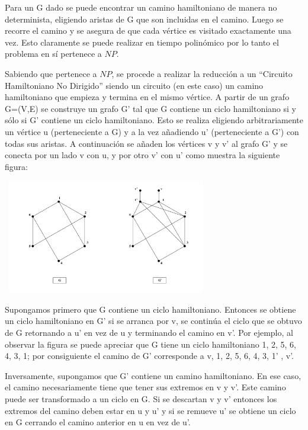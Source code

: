 \documentclass{article}
\newcommand\tab[1][0.5cm]{\hspace*{#1}}
\begin{document}
\begin{enumerate}
             \tab Para un G dado se puede encontrar un camino hamiltoniano de manera no determinista, eligiendo aristas de G que son
             incluidas en el camino. Luego se recorre el camino y se asegura de que cada vértice es visitado exactamente una vez.
             Esto claramente se puede realizar en tiempo polinómico por lo tanto el problema en sí pertenece a $NP$.

             \tab Sabiendo que pertenece a $NP$, se procede a realizar la reducción a un “Circuito Hamiltoniano No Dirigido” siendo un
             circuito (en este caso) un camino hamiltoniano que empieza y termina en el mismo vértice. A partir de un grafo
             G=(V,E) se construye un grafo G’ tal que G contiene un ciclo hamiltoniano si y sólo si  G’ contiene un ciclo hamiltoniano.
             Esto se realiza eligiendo arbitrariamente un vértice u (perteneciente a G) y a la vez añadiendo u’ (perteneciente a G’)
             con todas sus aristas. A continuación se añaden los vértices v y v’ al grafo G’ y se conecta por un lado v con u, y por otro v’
             con u’ como muestra la siguiente figura:

             \begin{center}
                 \includegraphics[width=9cm, height=5cm]{images/p3}
             \end{center}

             \tab Supongamos primero que G contiene un ciclo hamiltoniano. Entonces se obtiene un ciclo hamiltoniano en G’ si se arranca por v,
             se continúa el ciclo que se obtuvo de G retornando a u’ en vez de u  y terminando el camino en v’. Por ejemplo, al observar la
             figura se puede apreciar que G tiene un ciclo hamiltoniano 1, 2, 5, 6, 4, 3, 1; por consiguiente el camino de G’ corresponde
             a v, 1, 2, 5, 6, 4, 3, 1’ , v’.

             \tab Inversamente, supongamos que G’ contiene un camino hamiltoniano. En ese caso, el camino necesariamente tiene que tener sus
             extremos en v y v’. Este camino puede ser transformado a un ciclo en G. Si se descartan v y v’ entonces los extremos del camino
             deben estar en u y u’ y si se remueve u’ se obtiene un ciclo en G cerrando el camino anterior en u en vez de u’.


\end{enumerate}
\end{document}
